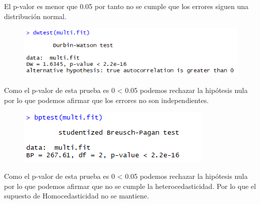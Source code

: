 \documentclass[a4paper,10pt,twocolumn]{article}
\begin{document}
\begin{itemize}
			El p-valor es menor que 0.05 por tanto no se cumple que los errores siguen una distribución normal.




			\begin{figure}[H]
				\begin{center}
					\includegraphics[width=.92\columnwidth,right]{figures/sup3.png}
				\end{center}
			\end{figure}

			Como el p-valor de esta prueba es 0 < 0.05 podemos rechazar la hipótesis nula por lo que 
			podemos afirmar que los errores no son independientes. 




			\begin{figure}[H]
				\begin{center}
					\includegraphics[width=.92\columnwidth,right]{figures/sup4.png}
				\end{center}
			\end{figure}

			Como el p-valor de esta prueba es 0 < 0.05 podemos rechazar la hipótesis nula por lo que podemos 
			afirmar que no se cumple la heterocedasticidad. Por lo que el supuesto de Homocedasticidad no se mantiene.


\end{itemize}
\end{document}
